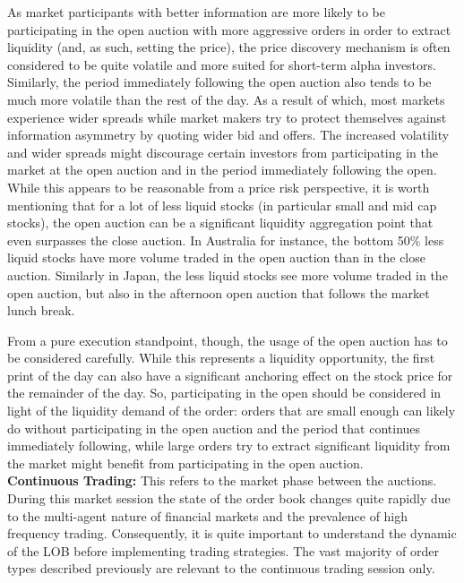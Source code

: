 As market participants with better information are more likely to be participating in the open auction with more aggressive orders in order to extract liquidity (and, as such, setting the price), the price discovery mechanism is often considered to be quite volatile and more suited for short-term alpha investors. Similarly, the period immediately following the open auction also tends to be much more volatile than the rest of the day. As a result of which, most markets experience wider spreads while market makers try to protect themselves against information asymmetry by quoting wider bid and offers. The increased volatility and wider spreads might discourage certain investors from participating in the market at the open auction and in the period immediately following the open. While this appears to be reasonable from a price risk perspective, it is worth mentioning that for a lot of less liquid stocks (in particular small and mid cap stocks), the open auction can be a significant liquidity aggregation point that even surpasses the close auction. In Australia for instance, the bottom 50\% less liquid stocks have more volume traded in the open auction than in the close auction. Similarly in Japan, the less liquid stocks see more volume traded in the open auction, but also in the afternoon open auction that follows the market lunch break.


From a pure execution standpoint, though, the usage of the open auction has to be considered carefully. While this represents a liquidity opportunity, the first print of the day can also have a significant anchoring effect on the stock price for the remainder of the day. So, participating in the open should be considered in light of the liquidity demand of the order: orders that are small enough can likely do without participating in the open auction and the period that continues immediately following, while large orders try to extract significant liquidity from the market might benefit from participating in the open auction. \\



\noindent\textbf{Continuous Trading:} This refers to the market phase between the auctions. During this market session  the state of the order book changes quite rapidly due to the multi-agent nature of financial markets and the prevalence of high frequency trading. Consequently, it is quite important to understand the dynamic of the LOB before implementing trading strategies. The vast majority of order types described previously are relevant to the continuous trading session only. \\

